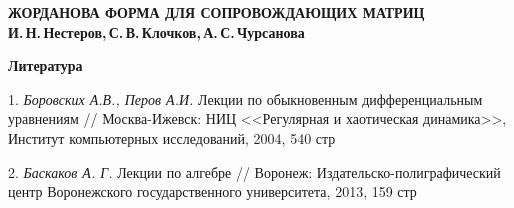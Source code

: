 \documentclass[10pt,a4paper,oneside]{article}
\begin{document}
 
\begin{center}
    \textbf{\LARGE ЖОРДАНОВА ФОРМА ДЛЯ СОПРОВОЖДАЮЩИХ МАТРИЦ} \\[1em]
    \textbf{И.\,Н.\,Нестеров,\,С.\,В.\,Клочков,\,А.\,С.\,Чурсанова} \\[2em]
\end{center}







\vfill

\smallskip \centerline{\bf Литература}\nopagebreak

1. \textit{ Боровских А.В., Перов А.И.} Лекции по обыкновенным дифференциальным уравнениям // Москва-Ижевск: НИЦ  <<Регулярная и хаотическая динамика>>, Институт компьютерных исследований, 2004, 540 стр

2. \textit{ Баскаков А. Г.} Лекции по алгебре // Воронеж: Издательско-полиграфический центр Воронежского государственного университета, 2013, 159 стр
\end{document}
